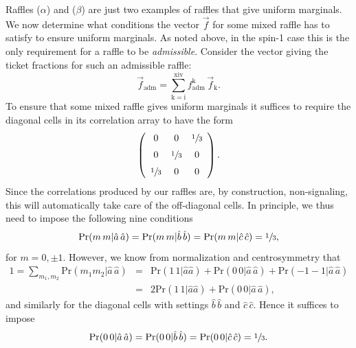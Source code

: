 Raffles ($\alpha$) and ($\beta$) are just two examples of raffles that give uniform marginals. We now determine what conditions the vector $\vec{f}$ for some mixed raffle has to satisfy to ensure uniform marginals. As noted above, in the spin-1 case this is the only requirement for a raffle to be \emph{admissible}.
Consider the vector giving the ticket fractions for such an admissible raffle:
\begin{equation}
\vec{f}_{\mathrm{adm}} = \sum_{\mathrm{k = i}}^{\mathrm{xiv}} f_{\mathrm{adm}}^{\mathrm{k}} \, \vec{f}_{\mathrm{k}}.
\end{equation}
To ensure that some mixed raffle gives uniform marginals it suffices to require the diagonal cells in its correlation array to have the form
\begin{equation}
\left(
\begin{array}{ccc}
0  & 0 & \sfrac13  \\[.2cm]
0  & \sfrac13  &  0  \\[.2cm]
\sfrac13  &  0  &  0 
\end{array}
\right).
\label{adm spin1 diag}
\end{equation}
Since the correlations produced by our raffles are, by construction, non-signaling, this will automatically take care of the off-diagonal cells. In principle, we thus need to impose the following nine conditions 
\begin{equation}
\mathrm{Pr}(m\,m|\hat{a} \, \hat{a})=\mathrm{Pr}(m\,m|\hat{b} \, \hat{b})=\mathrm{Pr}(m\,m|\hat{c} \, \hat{c})=\sfrac13,
\end{equation} 
for $m=0, \pm 1$. However, we know from normalization and centrosymmetry that
\begin{eqnarray}
1 =  \!  \sum_{m_1, m_2}  \!  \mathrm{Pr}(m_1 m_2|\hat{a}\,\hat{a}) & \!\! = \!\! & \mathrm{Pr}(1\,1|\hat{a}\hat{a})+\mathrm{Pr}(0\,0|\hat{a} \, \hat{a})+\mathrm{Pr}(-\!1 -\!1|\hat{a}\,\hat{a})  \nonumber \\
&  \!\! = \!\!  & 2 \mathrm{Pr}(1\,1|\hat{a}\hat{a})+\mathrm{Pr}(0\,0|\hat{a}\,\hat{a}),
\end{eqnarray}
and similarly for the diagonal cells with settings $\hat{b}\, \hat{b}$ and $\hat{c}\,\hat{c}$. Hence it suffices to impose 
\begin{equation}
\mathrm{Pr}(0\,0|\hat{a}\,\hat{a})=\mathrm{Pr}(0\,0|\hat{b}\,\hat{b})=\mathrm{Pr}(0\,0|\hat{c}\,\hat{c})=\sfrac13.
\label{uniform marginals spin-1}
\end{equation}
